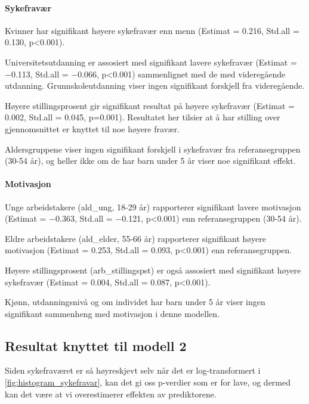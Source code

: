 \documentclass[
  12pt,
  a4paper,
  DIV=11,
  numbers=noendperiod]{scrartcl}
\let\oldparagraph\paragraph
\renewcommand{\paragraph}[1]{\oldparagraph{#1}\mbox{}}
\begin{document}
\paragraph{Sykefravær}\label{sykefravuxe6r-1}

Kvinner har signifikant høyere sykefravær enn menn (Estimat = 0.216,
Std.all = 0.130, p\textless0.001).

Universitetsutdanning er assosiert med signifikant lavere sykefravær
(Estimat = −0.113, Std.all = −0.066, p\textless0.001) sammenlignet med
de med videregående utdanning. Grunnskoleutdanning viser ingen
signifikant forskjell fra videregående.

Høyere stillingsprosent gir signifikant resultat på høyere sykefravær
(Estimat = 0.002, Std.all = 0.045, p=0.001). Resultatet her tilsier at å
har stilling over gjennomsnittet er knyttet til noe høyere fravær.

Aldersgruppene viser ingen signifikant forskjell i sykefravær fra
referansegruppen (30-54 år), og heller ikke om de har barn under 5 år
viser noe signifikant effekt.

\paragraph{Motivasjon}\label{motivasjon-1}

Unge arbeidstakere (ald\_ung, 18-29 år) rapporterer signifikant lavere
motivasjon (Estimat = −0.363, Std.all = −0.121, p\textless0.001) enn
referansegruppen (30-54 år).

Eldre arbeidstakere (ald\_elder, 55-66 år) rapporterer signifikant
høyere motivasjon (Estimat = 0.253, Std.all = 0.093, p\textless0.001)
enn referansegruppen.

Høyere stillingsprosent (arb\_stillingspst) er også assosiert med
signifikant høyere sykefravær (Estimat = 0.004, Std.all = 0.087,
p\textless0.001).

Kjønn, utdanningsnivå og om individet har barn under 5 år viser ingen
signifikant sammenheng med motivasjon i denne modellen.

\subsection{Resultat knyttet til modell
2}\label{resultat-knyttet-til-modell-2}

Siden sykefraværet er så høyreskjevt selv når det er log-transformert i
\autoref{fig:histogram_sykefravar}, kan det gi oss p-verdier som er for
lave, og dermed kan det være at vi overestimerer effekten av
prediktorene.
\end{document}
